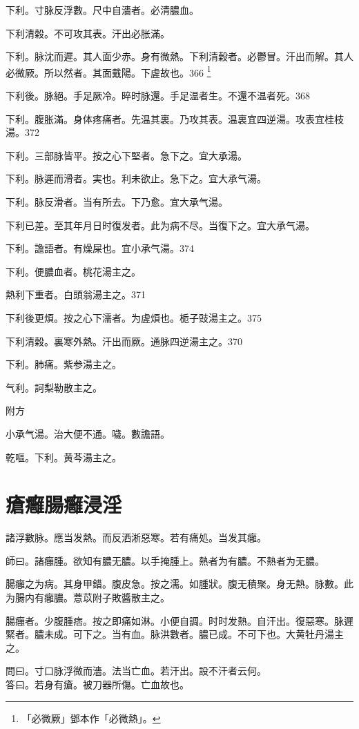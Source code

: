 下利。寸脉反浮數。尺中自濇者。必清膿血。

下利清穀。不可攻其表。汗出必胀滿。

下利。脉沈而遲。其人面少赤。身有微熱。下利清穀者。必鬱冒。汗出而解。其人必微厥。所以然者。其面戴陽。下虗故也。366
	\footnote{「必微厥」鄧本作「必微熱」。}

下利後。脉絕。手足厥{\khaaitp 冷}。晬时脉還。手足温者生。不還{\khaaitp 不温}者死。368

下利。腹胀滿。身体疼痛者。先温其裏。乃攻其表。温裏宜四逆湯。攻表宜桂枝湯。372

下利。三部脉皆平。按之心下堅者。急下之。宜大承湯。

下利。脉遲而滑者。実也。利未欲止。急下之。宜大承气湯。

下利。脉反滑{\khaaitp 者}。当有所去。下乃愈。宜大承气湯。

下利已差。至其{\khaaitp 年月日}时復发者。此为病不尽。当{\khaaitp 復}下之。宜{\khaaitp 大}承气湯。

下利。譫語者。有燥屎也。宜{\khaaitp 小}承气湯。374

下利。便膿血者。桃花湯主之。

熱利下重者。白頭翁湯主之。371

下利後更煩。按之心下濡者。为虗煩也。栀子{\khaaitp 豉}湯主之。375

下利清穀。裏寒外熱。汗出而厥。通脉四逆湯主之。370

下利。肺痛。紫参湯主之。

气利。訶梨勒散主之。

附方

小承气湯。治大便不通。噦。數譫語。

乾嘔。下利。黄芩湯主之。

\chapter{瘡癰腸癰浸淫}

諸浮數脉。應当发熱。而反洒淅惡寒。若有痛処。当发其癰。

師曰。諸癰腫。欲知有膿无膿。以手掩腫上。熱者为有膿。不熱者为无膿。

腸癰之为病。其身甲錯。腹皮急。按之濡。如腫狀。腹无積聚。身无熱。脉數。此为腸内有{\khaaitp 癰}膿。薏苡附子敗醬散主之。

腸癰者。少腹腫痞。按之即痛如淋。小便自調。时时发熱。自汗出。復惡寒。脉遲緊者。膿未成。可下之。当有血。脉洪數者。膿已成。不可下也。大黄牡丹湯主之。

問曰。寸口脉浮微而濇。法当亡血。若汗出。設不汗者云何。\\
答曰。若身有瘡。被刀器所傷。亡血故也。

